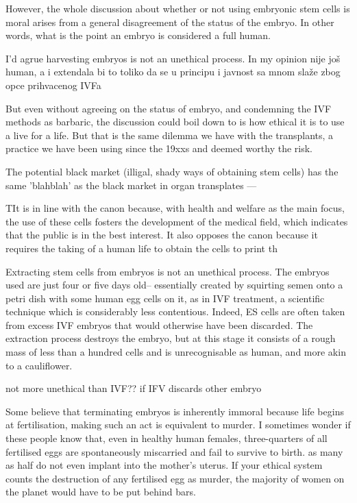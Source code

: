 \documentclass[12pt]{article} %
\begin{document}
However, the whole discussion about whether or not using embryonic stem cells is moral arises from a general disagreement of the status of the embryo. In other words, what is the point an embryo is considered a full human. 

I'd agrue harvesting embryos is not an unethical process. In my opinion nije još human, a i extendala bi to toliko da se u principu i javnost sa mnom slaže zbog opce prihvacenog IVFa


But even without agreeing on the status of embryo, and condemning the IVF methods as barbaric, the discussion could boil down to is 
how ethical it is to use a live for a life. But that is the same dilemma we have with the transplants, a practice we have been using since the 19xxs  and deemed worthy the risk. 

The potential black market (illigal, shady ways of obtaining stem cells) has the same 'blahblah' as the black market in organ transplates
---


TIt is in line with the canon because, with health and welfare as the main focus, the use of these cells fosters the development of the medical field, which indicates that the public is in the best interest.  It also opposes the canon because it requires the taking of a human life to obtain the cells to print th




Extracting stem cells from embryos is not an unethical process. The embryos used are just four or five days old– essentially created by squirting semen onto a petri dish with some human egg cells on it, as in IVF treatment, a scientific technique which is considerably less contentious. Indeed, ES cells are often taken from excess IVF embryos that would otherwise have been discarded. The extraction process destroys the embryo, but at this stage it consists of a rough mass of less than a hundred cells and is unrecognisable as human, and more akin to a cauliflower. 

not more unethical than IVF?? if IFV discards other embryo

Some believe that terminating embryos is inherently immoral because life begins at fertilisation, making such an act is equivalent to murder. I sometimes wonder if these people know that, even in healthy human females, three-quarters of all fertilised eggs are spontaneously miscarried and fail to survive to birth. as many as half do not even implant into the mother’s uterus. If your ethical system counts the destruction of any fertilised egg as murder, the majority of women on the planet would have to be put behind bars.
\end{document}

